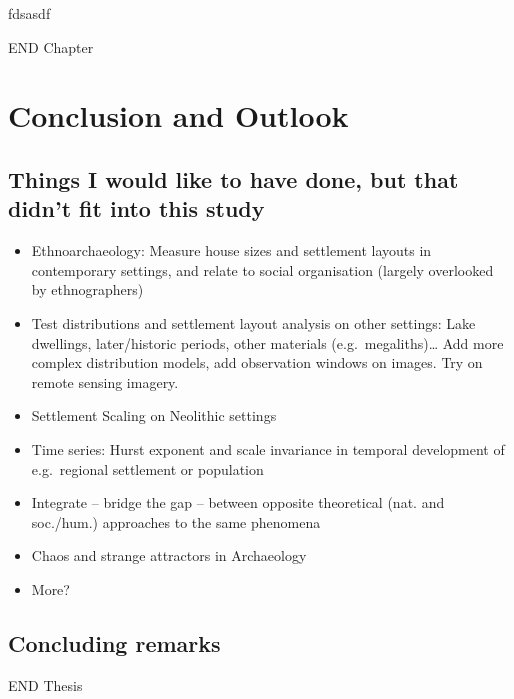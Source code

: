 \documentclass[
  12pt,
]{book}
\providecommand{\tightlist}{%
  \setlength{\itemsep}{0pt}\setlength{\parskip}{0pt}}
\begin{document}
fdsasdf

END Chapter

\hypertarget{conclusion}{%
\chapter{Conclusion and Outlook}\label{conclusion}}

\hypertarget{things-i-would-like-to-have-done-but-that-didnt-fit-into-this-study}{%
\section{Things I would like to have done, but that didn't fit into this study}\label{things-i-would-like-to-have-done-but-that-didnt-fit-into-this-study}}

\begin{itemize}
\tightlist
\item
  Ethnoarchaeology: Measure house sizes and settlement layouts in contemporary settings, and relate to social organisation (largely overlooked by ethnographers)
\item
  Test distributions and settlement layout analysis on other settings: Lake dwellings, later/historic periods, other materials (e.g.~megaliths)\ldots{} Add more complex distribution models, add observation windows on images. Try on remote sensing imagery.
\item
  Settlement Scaling on Neolithic settings
\item
  Time series: Hurst exponent and scale invariance in temporal development of e.g.~regional settlement or population
\item
  Integrate -- bridge the gap -- between opposite theoretical (nat. and soc./hum.) approaches to the same phenomena
\item
  Chaos and strange attractors in Archaeology
\item
  More?
\end{itemize}

\hypertarget{concluding-remarks}{%
\section{Concluding remarks}\label{concluding-remarks}}

END Thesis
\end{document}
